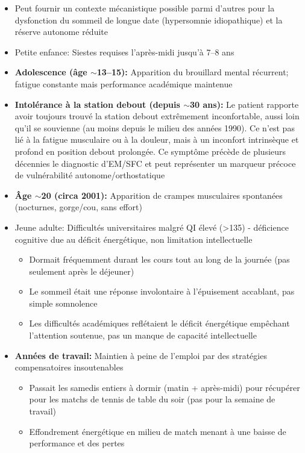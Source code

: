 \begin{description}
\begin{itemize}
        \item Peut fournir un contexte mécanistique possible parmi d'autres pour la dysfonction du sommeil de longue date (hypersomnie idiopathique) et la réserve autonome réduite
        \item Petite enfance: Siestes requises l'après-midi jusqu'à 7--8 ans
        \item \textbf{Adolescence (âge $\sim$13--15):} Apparition du brouillard mental récurrent; fatigue constante mais performance académique maintenue
        \item \textbf{Intolérance à la station debout (depuis $\sim$30 ans):} Le patient rapporte avoir toujours trouvé la station debout extrêmement inconfortable, aussi loin qu'il se souvienne (au moins depuis le milieu des années 1990). Ce n'est pas lié à la fatigue musculaire ou à la douleur, mais à un inconfort intrinsèque et profond en position debout prolongée. Ce symptôme précède de plusieurs décennies le diagnostic d'EM/SFC et peut représenter un marqueur précoce de vulnérabilité autonome/orthostatique
        \item \textbf{Âge $\sim$20 (circa 2001):} Apparition de crampes musculaires spontanées (nocturnes, gorge/cou, sans effort)
        \item Jeune adulte: Difficultés universitaires malgré QI élevé (>135) - déficience cognitive due au déficit énergétique, non limitation intellectuelle
        \begin{itemize}
            \item Dormait fréquemment durant les cours tout au long de la journée (pas seulement après le déjeuner)
            \item Le sommeil était une réponse involontaire à l'épuisement accablant, pas simple somnolence
            \item Les difficultés académiques reflétaient le déficit énergétique empêchant l'attention soutenue, pas un manque de capacité intellectuelle
        \end{itemize}
        \item \textbf{Années de travail:} Maintien à peine de l'emploi par des stratégies compensatoires insoutenables
        \begin{itemize}
            \item Passait les samedis entiers à dormir (matin + après-midi) pour récupérer pour les matchs de tennis de table du soir (pas pour la semaine de travail)
            \item Effondrement énergétique en milieu de match menant à une baisse de performance et des pertes

\end{itemize}
\end{itemize}
\end{description}
